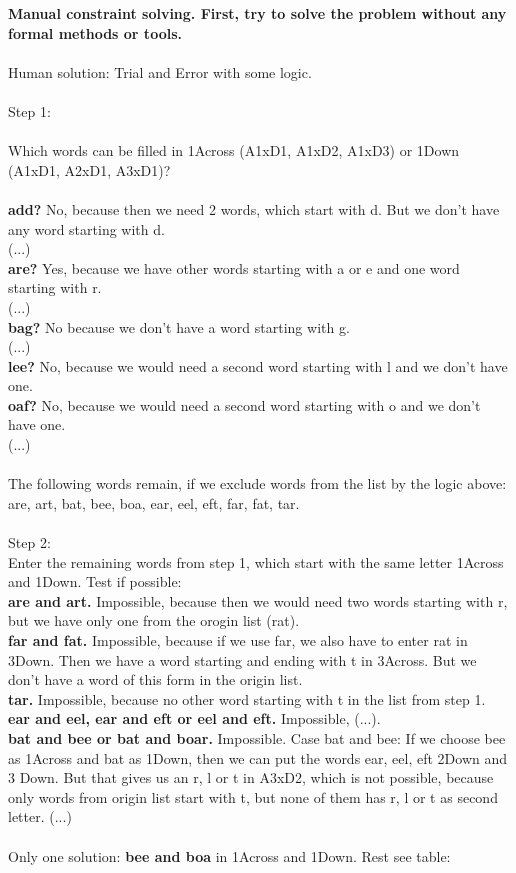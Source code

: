 \documentclass[10pt,a4paper]{article}
\begin{document}
\textbf{Manual constraint solving. First, try to solve the problem without any formal methods or tools.} 
\\ \\
Human solution: Trial and Error with some logic. \\ \\
Step 1: \\ \\
Which words can be filled in 1Across (A1xD1, A1xD2, A1xD3) or 1Down (A1xD1, A2xD1, A3xD1)? \\ \\
\textbf{add?} No, because then we need 2 words, which start with d. But we don't have any word starting with d. \\
(...) \\
\textbf{are?} Yes, because we have other words starting with a or e and one word starting with r. \\
(...)\\
\textbf{bag?} No because we don't have a word starting with g. \\
(...) \\
\textbf{lee?} No, because we would need a second word starting with l and we don't have one. \\
\textbf{oaf?} No, because we would need a second word starting with o and we don't have one. \\
(...) \\ \\

The following words remain, if we exclude words from the list by the logic above: \\ 
are, art, bat, bee, boa, ear, eel, eft, far, fat, tar. \\ \\

Step 2: \\
Enter the remaining words from step 1, which start with the same letter 1Across and 1Down. Test if possible: \\
\textbf{are and art.} Impossible, because then we would need two words starting with r, but we have only one from the orogin list (rat). \\
\textbf{far and fat.} Impossible, because if we use far, we also have to enter rat in 3Down. Then we have a word starting and ending with t in 3Across. But we don't have a word of this form in the origin list. \\
\textbf{tar.} Impossible, because no other word starting with t in the list from step 1. \\
\textbf{ear and eel, ear and eft or eel and eft.} Impossible, (...). \\
\textbf{bat and bee or bat and boar.} Impossible. Case bat and bee: If we choose bee as 1Across and bat as 1Down, then we can put the words ear, eel, eft 2Down and 3 Down. But that gives us an r, l or t in A3xD2, which is not possible, because only words from origin list start with t, but none of them has r, l or t as second letter. (...)  \\ \\
Only one solution: \textbf{bee and boa} in 1Across and 1Down. Rest see table: \\
\end{document}
